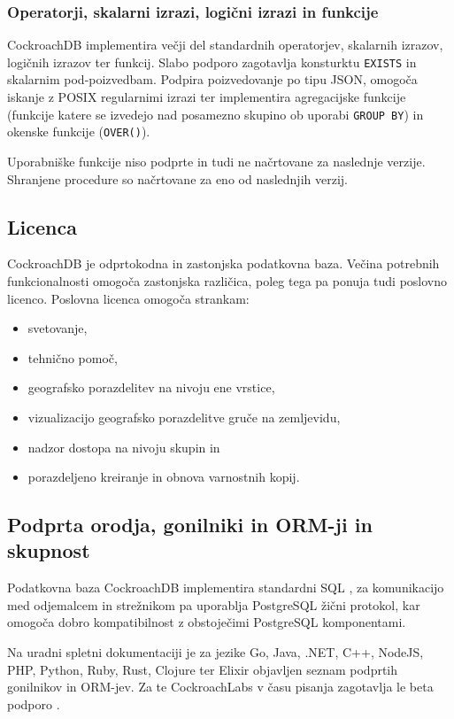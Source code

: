 \documentclass[a4paper, 12pt]{book}
\begin{document}
\subsubsection{Operatorji, skalarni izrazi, logični izrazi in funkcije}
CockroachDB implementira večji del standardnih operatorjev, skalarnih izrazov, logičnih izrazov ter funkcij. Slabo podporo zagotavlja konsturktu \texttt{EXISTS} in skalarnim pod-poizvedbam. Podpira poizvedovanje po tipu JSON, omogoča iskanje z POSIX regularnimi izrazi ter implementira agregacijske funkcije (funkcije katere se izvedejo nad posamezno skupino ob uporabi \texttt{GROUP BY}) in okenske funkcije (\texttt{OVER()}).

Uporabniške funkcije niso podprte in tudi ne načrtovane za naslednje verzije. Shranjene procedure so načrtovane za eno od naslednjih verzij.

\subsection{Licenca}

CockroachDB je odprtokodna in zastonjska podatkovna baza. Večina potrebnih funkcionalnosti omogoča zastonjska različica, poleg tega pa ponuja tudi poslovno licenco. Poslovna licenca omogoča strankam:

\begin{itemize}
    \item svetovanje,
    \item tehnično pomoč,
    \item geografsko porazdelitev na nivoju ene vrstice,
    \item vizualizacijo geografsko porazdelitve gruče na zemljevidu,
    \item nadzor dostopa na nivoju skupin in
    \item porazdeljeno kreiranje in obnova varnostnih kopij.
\end{itemize}

\subsection{Podprta orodja, gonilniki in ORM-ji in skupnost}

Podatkovna baza CockroachDB implementira standardni SQL \cite{CRDB-sql-standard}, za komunikacijo med odjemalcem in strežnikom pa uporablja PostgreSQL žični protokol, kar omogoča dobro kompatibilnost z obstoječimi PostgreSQL komponentami.

Na uradni spletni dokumentaciji je za jezike Go, Java, .NET, C++, NodeJS, PHP, Python, Ruby, Rust, Clojure ter Elixir objavljen seznam podprtih gonilnikov in ORM-jev. Za te CockroachLabs v času pisanja zagotavlja le beta podporo \cite{CRDB-meta-drivers-orms}.
\end{document}
